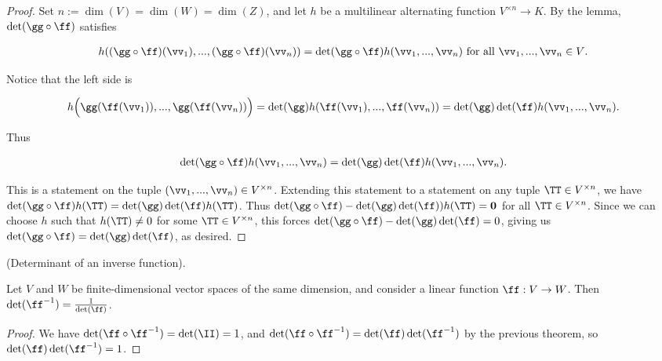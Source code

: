 \begin{proof}
   Set $n := \dim(V) = \dim(W) = \dim(Z)$, and let $h$ be a multilinear alternating function $V^{\times n} \rightarrow K$. By the lemma, $\det(\gg \circ \ff)$ satisfies
   
   \begin{align*}
       h((\gg \circ \ff)(\vv_1), ..., (\gg \circ \ff)(\vv_n)) = \det(\gg \circ \ff) h(\vv_1, ..., \vv_n) \text{ for all $\vv_1, ..., \vv_n \in V$}.
   \end{align*}
   
   Notice that the left side is
   
   \begin{align*}
       h\Big(\gg(\ff(\vv_1)), ..., \gg(\ff(\vv_n))\Big) = \det(\gg) h(\ff(\vv_1), ..., \ff(\vv_n)) =
       \det(\gg) \det(\ff) h(\vv_1, ..., \vv_n).
   \end{align*}
   
   Thus
   
   \begin{align*}
       \det(\gg \circ \ff) h(\vv_1, ..., \vv_n) = \det(\gg) \det(\ff) h(\vv_1, ..., \vv_n).
   \end{align*}
   
   This is a statement on the tuple $(\vv_1, ..., \vv_n) \in V^{\times n}$. Extending this statement to a statement on any tuple $\TT \in V^{\times n}$, we have $\det(\gg \circ \ff) h(\TT) = \det(\gg) \det(\ff) h(\TT)$. Thus ${\det(\gg \circ \ff) - \det(\gg) \det(\ff)) h(\TT) = \mathbf{0}}$ for all $\TT \in V^{\times n}$. Since we can choose $h$ such that $h(\TT) \neq 0$ for some $\TT \in V^{\times n}$, this forces $\det(\gg \circ \ff) - \det(\gg) \det(\ff) = 0$, giving us $\det(\gg \circ \ff) = \det(\gg) \det(\ff)$, as desired.
\end{proof}

\begin{theorem}
    (Determinant of an inverse function).
    
    Let $V$ and $W$ be finite-dimensional vector spaces of the same dimension, and consider a linear function $\ff:V \rightarrow W$. Then $\det(\ff^{-1}) = \frac{1}{\det(\ff)}$.
\end{theorem}

\begin{proof}
   We have $\det(\ff \circ \ff^{-1}) = \det(\II) = 1$, and $\det(\ff \circ \ff^{-1}) = \det(\ff) \det(\ff^{-1})$ by the previous theorem, so $\det(\ff) \det(\ff^{-1}) = 1$.
\end{proof}

